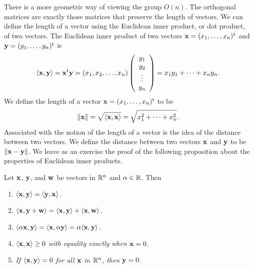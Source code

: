  
There is a more geometric way of viewing the group $O(n)$. The
orthogonal matrices are exactly those matrices that preserve the
length of vectors. We can define the length of a vector using the
{\bfi Euclidean inner product}, or
{\bfi dot product}, of two vectors. The Euclidean inner product of
two vectors ${\bold x}=(x_1, \ldots, x_n)^{\rm t}$ and ${\bold
y}=(y_1, \ldots, y_n)^{\rm t}$ is
\[
\langle  {\bold x}, {\bold y} \rangle
=
{\bold x}^{\rm t}  {\bold y}
=
(x_1, x_2, \ldots, x_n)
\left(
\begin{array}{c}
y_1 \\
y_2 \\
\vdots \\
y_n
\end{array}
\right)
=
x_1 y_1 + \cdots + x_n y_n.
\]
We define the length of a vector ${\bold x}=(x_1, \ldots, x_n)^{\rm
t}$ to be 
\[
\| {\bold x} \|\label{notelengthvect} 
= \sqrt{\langle  {\bold x}, {\bold x} \rangle} 
= \sqrt{x_1^2 + \cdots + x_n^2}.
\]
Associated with the notion of the length of a vector is the idea of
the distance between two vectors. We define the {\bfi distance\/}
between two vectors ${\bold x}$ and ${\bold y}$ to be $\| {\bold
x}-{\bold y} \|$. We leave as an exercise the proof of the following
proposition about the properties of Euclidean inner products.  
 
 
\begin{proposition}
Let ${\bold x}$, ${\bold y}$, and ${\bold w}$ be vectors in ${\Bbb
R}^n$ and $\alpha \in {\Bbb R}$. Then 
\begin{enumerate}
 
\rm \item \it
$\langle {\bold x}, {\bold y} \rangle = \langle {\bold y}, {\bold x}
\rangle$. 
 
\rm \item \it
$\langle {\bold x}, {\bold y} + {\bold w} \rangle = \langle {\bold x},
{\bold y} \rangle + \langle {\bold x}, {\bold w} \rangle$.
 
\rm \item \it
$\langle \alpha {\bold x}, {\bold y} \rangle = \langle {\bold x},
\alpha {\bold y} \rangle = \alpha \langle  {\bold x}, {\bold y}
\rangle$. 
 
\rm \item \it
$\langle {\bold x}, {\bold x} \rangle \geq 0$ with equality exactly
when ${\bold x} = 0$. 
 
\rm \item \it
If $\langle {\bold x}, {\bold y} \rangle = 0$  for all ${\bold x}$ in
${\Bbb R}^n$, then ${\bold y} = 0$. 
 
\end{enumerate}
\end{proposition}
 
